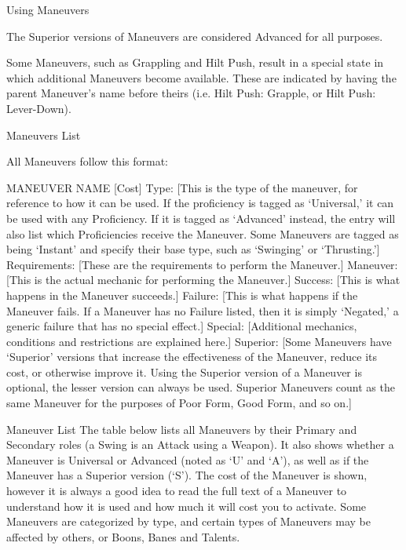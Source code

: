\documentclass[oneside,11pt,english]{book}
\begin{document}
Using Maneuvers 

 

The Superior versions of Maneuvers are considered Advanced for all purposes. 


 

Some Maneuvers, such as Grappling and Hilt Push, result in a special state in which additional 
Maneuvers become available. These are indicated by having the parent Maneuver’s name before theirs 
(i.e. Hilt Push: Grapple, or Hilt Push: Lever-Down). 

 

Maneuvers List 

 

All Maneuvers follow this format: 

 

MANEUVER NAME [Cost] 
Type: [This is the type of the maneuver, for reference to how it can be used. If the proficiency is tagged 
as ‘Universal,’ it can be used with any Proficiency. If it is tagged as ‘Advanced’ instead, the entry will 
also list which Proficiencies receive the Maneuver. Some Maneuvers are tagged as being ‘Instant’ and 
specify their base type, such as ‘Swinging’ or ‘Thrusting.’] 
Requirements: [These are the requirements to perform the Maneuver.] 
Maneuver: [This is the actual mechanic for performing the Maneuver.] 
Success: [This is what happens in the Maneuver succeeds.] 
Failure: [This is what happens if the Maneuver fails. If a Maneuver has no Failure listed, then it is simply 
‘Negated,’ a generic failure that has no special effect.] 
Special: [Additional mechanics, conditions and restrictions are explained here.] 
Superior: [Some Maneuvers have ‘Superior’ versions that increase the effectiveness of the Maneuver, 
reduce its cost, or otherwise improve it. Using the Superior version of a Maneuver is optional, the lesser 
version can always be used. Superior Maneuvers count as the same Maneuver for the purposes of Poor 
Form, Good Form, and so on.] 
 
Maneuver List 
The table below lists all Maneuvers by their Primary and Secondary roles (a Swing is an Attack using a 
Weapon). It also shows whether a Maneuver is Universal or Advanced (noted as ‘U’ and ‘A’), as well as 
if the Maneuver has a Superior version (‘S’). The cost of the Maneuver is shown, however it is always a 
good idea to read the full text of a Maneuver to understand how it is used and how much it will cost you 
to activate. Some Maneuvers are categorized by type, and certain types of Maneuvers may be affected by 
others, or Boons, Banes and Talents. 
\end{document}
